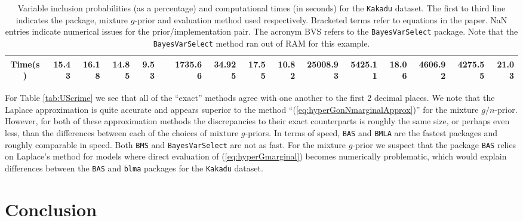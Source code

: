 \begin{sidewaystable}[h!]
\begin{center}
{\begin{tabular}{c|r|r|rrrrrr|rrrr|rrr}
				Time(s) & 15.43 & 16.18 & 14.85  &  9.53   &       & 1735.66  & 34.925  &   17.55 &  10.82         &  25008.93 & 
				5425.11  &   18.06   & 4606.92       &  4275.55  & 21.03  \\ 
				\hline
			\end{tabular}
		}
	\end{center}
    \caption{Variable inclusion probabilities (as a percentage) and
        computational times (in seconds) for the {\tt Kakadu} dataset.  The
        first to third line indicates the package, mixture $g$-prior and
        evaluation method used respectively. Bracketed terms refer to equations
    in the paper. NaN entries indicate numerical issues for the
prior/implementation pair. The acronym BVS refers to the {\tt BayesVarSelect}
package. Note that the {\tt BayesVarSelect} method ran out of RAM for this
example.}
	\label{tab:Kakadu}
\end{sidewaystable}


For Table \ref{tab:UScrime} we see that all of the ``exact'' methods agree with
one another to the first 2 decimal places. We note that the Laplace
approximation is quite accurate and appears superior to  the method
``(\ref{eq:hyperGonNmarginalApprox})'' for the mixture $g/n$-prior. However,
for both of these approximation methods the discrepancies to their exact
counterparts is roughly the same size, or perhaps even less, than the
differences between each of the choices of mixture $g$-priors. In terms of
speed, {\tt BAS} and {\tt BMLA} are the fastest packages and roughly comparable
in speed. Both {\tt BMS} and {\tt BayesVarSelect} are not as fast.  For the
mixture $g$-prior we suspect that the package {\tt BAS} relies on Laplace's
method for models where direct evaluation of (\ref{eq:hyperGmarginal}) becomes
numerically problematic, which would explain differences between the {\tt BAS}
and {\tt blma} packages for the {\tt Kakadu} dataset.

\section{Conclusion}
\label{sec:chapter_3_conclusion}

